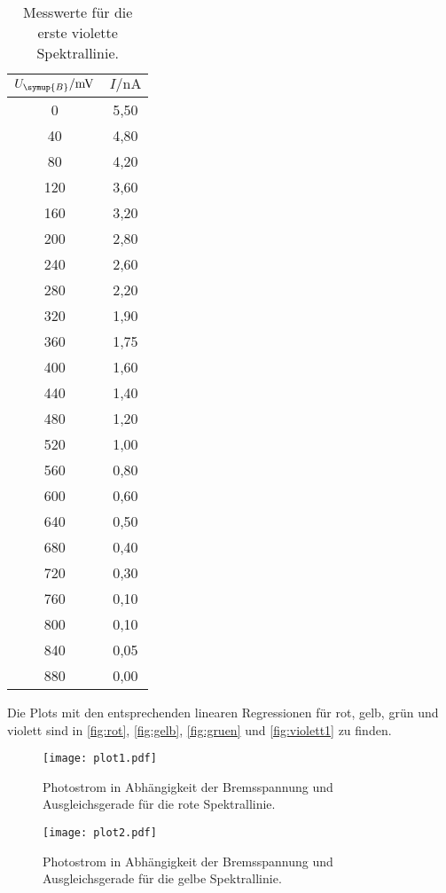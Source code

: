 \begin{table}[!hbt]
    \centering
    \caption{Messwerte für die erste violette Spektrallinie.}
    \label{tab:violett1}
    \begin{tabular}{c c}
        \toprule
        $U_{\symup{B}} / \unit{\milli\volt}$ & $I / \unit{\nano\ampere}$ \\
        \midrule
          0 & 5,50 \\
         40 & 4,80 \\
         80 & 4,20 \\
        120 & 3,60 \\
        160 & 3,20 \\
        200 & 2,80 \\
        240 & 2,60 \\
        280 & 2,20 \\
        320 & 1,90 \\
        360 & 1,75 \\
        400 & 1,60 \\
        440 & 1,40 \\
        480 & 1,20 \\
        520 & 1,00 \\
        560 & 0,80 \\
        600 & 0,60 \\
        640 & 0,50 \\
        680 & 0,40 \\
        720 & 0,30 \\
        760 & 0,10 \\
        800 & 0,10 \\
        840 & 0,05 \\
        880 & 0,00 \\
        \bottomrule
    \end{tabular}
\end{table}

Die Plots mit den entsprechenden linearen Regressionen für rot, gelb, grün und violett sind in
\autoref{fig:rot}, \autoref{fig:gelb}, \autoref{fig:gruen} und \autoref{fig:violett1} zu finden.
\begin{figure}[!hbt]
    \centering
    \label{fig:rot}
    \caption{Photostrom in Abhängigkeit der Bremsspannung und Ausgleichsgerade für die rote Spektrallinie.}
    \texttt{[image: plot1.pdf]}
\end{figure}

\begin{figure}[!hbt]
    \centering
    \label{fig:gelb}
    \caption{Photostrom in Abhängigkeit der Bremsspannung und Ausgleichsgerade für die gelbe Spektrallinie.}
    \texttt{[image: plot2.pdf]}
\end{figure}


